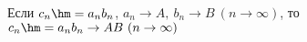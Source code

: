 \label{U30}
Если $c_n\hm=a_nb_n$, $a_n\to A,\ b_n\to B\ (n\to\infty)$, то $c_n\hm=a_nb_n\to AB \ (n\to\infty)$

